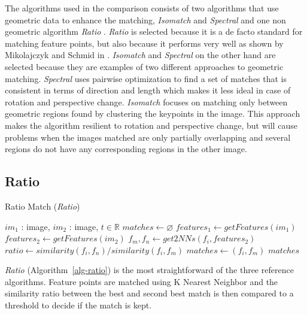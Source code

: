 The algorithms used in the comparison consists of two algorithms that 
use geometric data to enhance the matching, \emph{Isomatch} 
\cite{das2008event} and \emph{Spectral} \cite{leordeanu2005spectral} and 
one non geometric algorithm \emph{Ratio} \cite{lowe2004sift}.  
\emph{Ratio} is selected because it is a de facto standard for matching 
feature points, but also because it performs very well as shown by 
Mikolajczyk and Schmid in \cite{mikolajczyk2005performance}.  
\emph{Isomatch} and \emph{Spectral} on the other hand are selected 
because they are examples of two different approaches to geometric 
matching. \emph{Spectral} uses pairwise optimization to find a set of 
matches that is consistent in terms of direction and length which makes 
it less ideal in case of rotation and perspective change. 
\emph{Isomatch} focuses on matching only between geometric regions found 
by clustering the keypoints in the image.  This approach makes the 
algorithm resilient to rotation and perspective change, but will cause 
problems when the images matched are only partially overlapping and 
several regions do not have any corresponding regions in the other 
image.

\subsection{Ratio}
\label{ss:ratio}

\begin{algorithm}[htb]
\caption{Ratio Match (\emph{Ratio})}
\label{alg-ratio}
\begin{algorithmic}
\Require $im_1$ : image, $im_2$ : image, $t \in \mathbb{R}$
\State $matches\gets \varnothing$
\State $features_1 \gets getFeatures(im_1)$
\State $features_2 \gets getFeatures(im_2)$
    \State $f_m,f_n \gets get2NNs(f_i, features_2)$
	\State $ratio \gets similarity(f_i, f_n) / similarity(f_i, f_m)$
        \State $matches \gets \left(f_i, f_m\right)$
	\EndIf
\EndFor
\Return $matches$
\end{algorithmic}
\end{algorithm}

\emph{Ratio} (Algorithm~\ref{alg-ratio}) \cite{lowe2004sift} is the most 
straightforward of the three reference algorithms. Feature points are 
matched using K Nearest Neighbor and the similarity ratio between the 
best and second best match is then compared to a threshold to decide if 
the match is kept.

